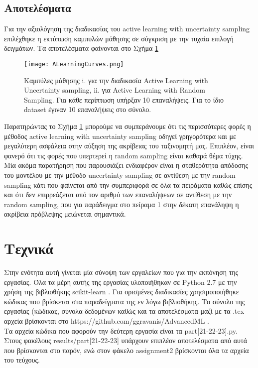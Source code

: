 %	
 


\subsection{Αποτελέσματα}

Για την αξιολόγηση της διαδικασίας του active learning with uncertainty sampling επιλέχθηκε η εκτύπωση καμπυλών μάθησης σε σύγκριση με την τυχαία επιλογή δειγμάτων. Τα αποτελέσματα φαίνονται στο Σχήμα \ref{fig: Active Learning Curves}


\begin{figure}
	\texttt{[image: ALearningCurves.png]} %
	\caption{Καμπύλες μάθησης i. για την διαδικασία Active Learning with Uncertainty sampling, ii. για Active Learning with Random Sampling. Για κάθε περίπτωση υπήρξαν 10 επαναλήψεις. Για το ίδιο dataset έγιναν 10 επαναλήψεις στο σύνολο.}
	\label{fig: Active Learning Curves}
\end{figure}


Παρατηρώντας το Σχήμα \ref{fig: Active Learning Curves} μπορούμε να συμπεράνουμε ότι τις περισσότερες φορές η μέθοδος active learning with uncertainty sampling οδηγεί γρηγορότερα και με μεγαλύτερη ασφάλεια στην αύξηση της ακρίβειας του ταξινομητή μας. Επιπλέον, είναι φανερό ότι τις φορές που υπερτερεί η random sampling είναι καθαρά θέμα τύχης. Μία ακόμα παρατήρηση που παρουσιάζει ενδιαφέρον είναι η σταθερότητα απόδοσης του μοντέλου με την μέθοδο uncertainty sampling σε αντίθεση με την random sampling κάτι που φαίνεται από την συμπεριφορά σε όλα τα πειράματα καθώς επίσης και ότι δεν επιρρεάζεται από τον αριθμό των επαναλήψεων σε αντίθεση με την random sampling, που για παράδειγμα στο πείραμα 1 στην δέκατη επανάληψη η ακρίβεια πρόβλεψης μειώνεται σημαντικά.


\section{Τεχνικά}

Στην ενότητα αυτή γίνεται μία σύνοψη των εργαλείων που για την εκπόνηση της εργασίας.
Όλα τα μέρη αυτής της εργασίας υλοποιήθηκαν σε Python 2.7 με την χρήση της βιβλιοθήκης scikit-learn \citep{scikit-learn}. Για ορισμένες διαδικασίες χρησιμοποιήθηκε κώδικας που βρίσκεται στα παραδείγματα της εν λόγω βιβλιοθήκης. Το σύνολο της εργασίας (κώδικας, σύνολα δεδομένων καθώς και τα αποτελέσματα μαζί με τα .tex αρχεία βρίσκονται στο https://github.com/ggravanis/AdvancedML . \\
Τα αρχεία κώδικα που αφορούν την δεύτερη εργασία είναι τα part[21-22-23].py. Στους φακέλους results/part[21-22-23] υπάρχουν επιπλέον αποτελέσματα από αυτά που βρίσκονται στο παρόν, ενώ στον φάκελο assignment2 βρίσκονται όλα τα αρχεία του τεύχους.
